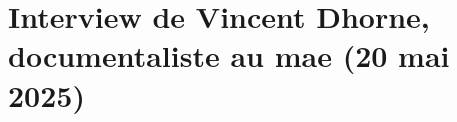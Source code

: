 \documentclass[12pt,twoside]{book}
\newcommand{\mae}{\ac{mae} }
\begin{document}
	\chapter[Interview V. Dhorne]{\label{Ax-D}Interview de Vincent Dhorne, documentaliste au \mae (20 mai 2025)}
		
	\newpage{\pagestyle{empty}\cleardoublepage}
	
	
	
	\backmatter %
	
	
	
	
	\printglossaries
	
	
	\listoftables
	
	\listoffigures
	
	\tableofcontents
	
	
\end{document}
